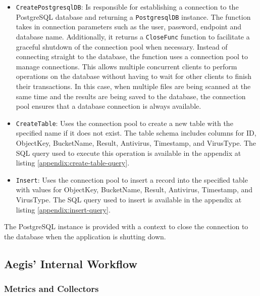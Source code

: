 \documentclass[12pt, conference, final, a4paper, onecolumn, compsoc]{IEEEtran}
\begin{document}
\begin{itemize}
  \item \texttt{CreatePostgresqlDB}: Is responsible for establishing a
        connection to the PostgreSQL database and returning a
        \texttt{PostgresqlDB} instance. The function takes in connection
        parameters such as the user, password, endpoint and database name.
        Additionally, it returns a \texttt{CloseFunc} function to facilitate a
        graceful shutdown of the connection pool when necessary. Instead of
        connecting straight to the database, the function uses a connection pool
        to manage connections. This allows multiple concurrent clients to
        perform operations on the database without having to wait for other
        clients to finish their transactions. In this case, when multiple files
        are being scanned at the same time and the results are being saved to
        the database, the connection pool ensures that a database connection is
        always available.
  \item \texttt{CreateTable}: Uses the connection pool to create a new table
        with the specified name if it does not exist. The table schema includes
        columns for ID, ObjectKey, BucketName, Result, Antivirus, Timestamp, and
        VirusType. The SQL query used to execute this operation is available in
        the appendix at listing \ref{appendix:create-table-query}.
  \item \texttt{Insert}: Uses the connection pool to insert a record into the
        specified table with values for ObjectKey, BucketName, Result,
        Antivirus, Timestamp, and VirusType. The SQL query used to insert is
        available in the appendix at listing \ref{appendix:insert-query}.
\end{itemize}

The PostgreSQL instance is provided with a context to close the connection to
the database when the application is shutting down.

\subsection*{Aegis' Internal Workflow}
\paragraph{}

\subsubsection*{Metrics and Collectors}
\end{document}
